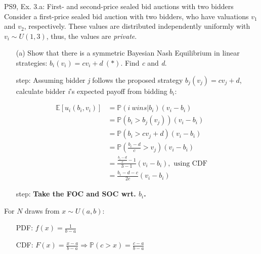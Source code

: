 \begin{frame}{PS9, Ex. 3.a: First- and second-price sealed bid auctions with two bidders}
    Consider a first-price sealed bid auction with two bidders, who have valuations $v_1$ and $v_2$, respectively. These values are distributed independently uniformly with $v_i\sim U(1,3)$, thus, the values are \textit{private}.
    \vspace{-4pt}
    \begin{itemize}
      \item[(a)] Show that there is a symmetric Bayesian Nash Equilibrium in linear strategies: $b_i(v_i) = cv_i + d\ (*)$. Find \textit{c} and \textit{d}.
    \end{itemize}
    \vspace{-8pt}
    \begin{multicols}{2}
      \begin{itemize}
        \item[\nth{1} step:] Assuming bidder \textit{j} follows the proposed strategy $b_j(v_j) = cv_j + d$, calculate bidder \textit{i}'s expected payoff from bidding $b_i$:
      \end{itemize}
      \vspace{-4pt}
      \begin{align*}
        \mathbb{E}[u_i(b_i,v_i)]&=\mathbb{P}(i\ wins|b_i)(v_i-b_i)\\
                                &=\mathbb{P}(b_i>b_j(v_j))(v_i-b_i)\\
                                &=\mathbb{P}(b_i>cv_j+d)(v_i-b_i)\\
                                &=\mathbb{P}\left(\frac{b_i-d}{c}>v_j\right)(v_i-b_i)\\
                                &=\frac{\frac{b_i-d}{c}-1}{3-1}(v_i-b_i),\text{ using CDF}\\
                                &=\frac{b_i-d-c}{2c}(v_i-b_i)
      \end{align*}
      \vspace{-10pt}
      \begin{itemize}
        \item[\nth{2} step:] \textbf{Take the FOC and SOC wrt. $b_i$.}
      \end{itemize}
      \vfill\null\columnbreak
      For $N$ draws from $x\sim U(a, b):$
      \vspace{-6pt}
      \begin{enumerate}
        \item[PDF:] $f(x)=\frac{1}{b-a}$
        \item[CDF:] $F(x)=\frac{x-a}{b-a}\Rightarrow\mathbb{P}(c>x)=\frac{c-a}{b-a}$

\end{enumerate}
\end{multicols}
\end{frame}
